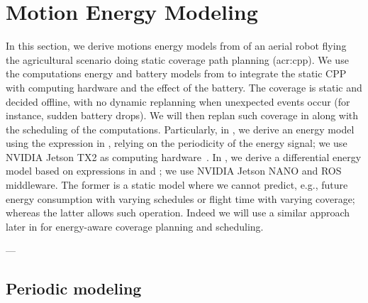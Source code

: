 \section{Motion Energy Modeling}
\label{sec:res-ene-mot}

In this section, we derive motions energy models from  of an aerial robot flying the agricultural scenario doing static coverage path planning (\Gls{acr:cpp}). We use the computations energy and battery models from  to integrate the static CPP with computing hardware and the effect of the battery. The coverage is static and decided offline, with no dynamic replanning when unexpected events occur (for instance, sudden battery drops). We will then replan such coverage in  along with the scheduling of the computations. Particularly, in , we derive an energy model using the expression in , relying on the periodicity of the energy signal; we use NVIDIA Jetson TX2 as computing hardware~\citep{seewald2020mechanical}. In , we derive a differential energy model based on expressions in  and ; we use NVIDIA Jetson NANO and ROS middleware. The former is a static model where we cannot predict, e.g., future energy consumption with varying schedules or flight time with varying coverage; whereas the latter allows such operation. Indeed we will use a similar approach later in  for energy-aware coverage planning and scheduling.

---

\subsection{Periodic modeling}
\label{sec:res-perio}

